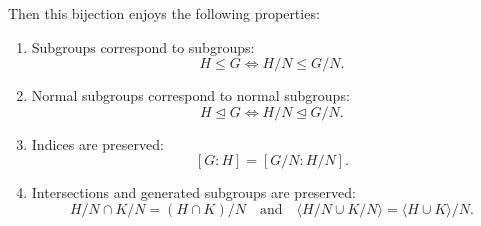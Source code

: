 \documentclass[12pt]{amsart}
\begin{document}
\begin{framed}
Then this bijection enjoys the following properties:
\begin{enumerate}
\item Subgroups correspond to subgroups:
$$H \leq G \iff H/N \leq G/N.$$
\item Normal subgroups correspond to normal subgroups: 
$$H \trianglelefteq G \iff H/N \trianglelefteq G/N.$$
\item Indices are preserved:
$$[G:H] = [G/N : H/N].$$
\item Intersections and generated subgroups are preserved:
$$H/N \cap K/N = (H \cap K)/N \quad \textrm{and} \quad \langle H/N \cup K/N \rangle = \langle H \cup K \rangle/N.$$
\end{enumerate}



\end{framed}
\end{document}
